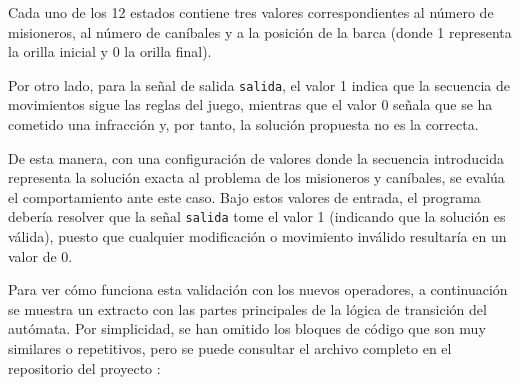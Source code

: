 \documentclass[a4paper,12pt]{report}
\begin{document}
	
	\vspace{0.2cm}
	\noindent Cada uno de los 12 estados contiene tres valores correspondientes al número de misioneros, al número de caníbales y a la posición de la barca (donde 1 representa la orilla inicial y 0 la orilla final). 
	
	\vspace{0.2cm}
	\noindent Por otro lado, para la señal de salida \texttt{salida}, el valor 1 indica que la secuencia de movimientos sigue las reglas del juego, mientras que el valor 0 señala que se ha cometido una infracción y, por tanto, la solución propuesta no es la correcta.
	
	
	
	\vspace{0.3cm}
	\noindent De esta manera, con una configuración de valores donde la secuencia introducida representa la solución exacta al problema de los misioneros y caníbales, se evalúa el comportamiento ante este caso. Bajo estos valores de entrada, el programa debería resolver que la señal \texttt{salida} tome el valor 1 (indicando que la solución es válida), puesto que cualquier modificación o movimiento inválido resultaría en un valor de 0. 
	
	\vspace{0.3cm}
	\noindent Para ver cómo funciona esta validación con los nuevos operadores, a continuación se muestra un extracto con las partes principales de la lógica de transición del autómata. Por simplicidad, se han omitido los bloques de código que son muy similares o repetitivos, pero se puede consultar el archivo completo en el repositorio del proyecto \cite{rps_circom}:
	
\end{document}
